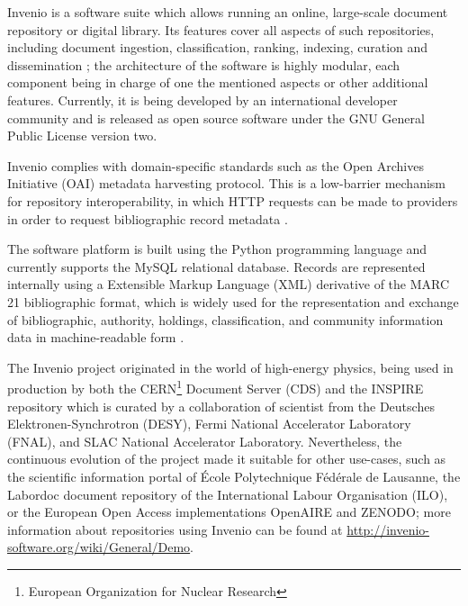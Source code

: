 
Invenio \cite{ref:invenio} is a software suite which allows running an online,
large-scale document repository or digital library. Its features cover all
aspects of such repositories, including document ingestion, classification,
ranking, indexing, curation and dissemination \cite{ref:kaplun, ref:glauner};
the architecture of the software is highly modular, each component being in
charge of one the mentioned aspects or other additional features. Currently, it
is being developed by an international developer community and is released as
open source software under the GNU General Public License version two.

Invenio complies with domain-specific standards such as the Open Archives
Initiative (OAI) metadata harvesting protocol. This is a low-barrier mechanism for
repository interoperability, in which HTTP requests can be made to providers in
order to request bibliographic record metadata \cite{ref:oai}.

The software platform is built using the Python programming language and
currently supports the MySQL relational database. Records are represented
internally using a Extensible Markup Language (XML) derivative of the MARC 21
bibliographic format, which is widely used for the representation and exchange
of bibliographic, authority, holdings, classification, and community
information data in machine-readable form \cite{ref:marc}.

The Invenio project originated in the world of high-energy physics, being used
in production by both the CERN\footnote{European Organization for Nuclear
Research} Document Server (CDS) and the INSPIRE repository which is curated
by a collaboration of scientist from the Deutsches Elektronen-Synchrotron
(DESY), Fermi National Accelerator Laboratory (FNAL), and SLAC National
Accelerator Laboratory. Nevertheless, the continuous evolution of the project
made it suitable for other use-cases, such as the scientific information portal
of \'{E}cole Polytechnique F\'{e}d\'{e}rale de Lausanne, the Labordoc document
repository of the International Labour Organisation (ILO), or the European Open
Access implementations OpenAIRE and ZENODO; more information about repositories
using Invenio can be found at
\url{http://invenio-software.org/wiki/General/Demo}.
